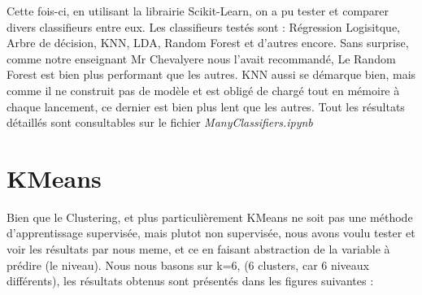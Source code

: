 \documentclass[11pt]{article}
\begin{document}
Cette fois-ci, en utilisant la librairie Scikit-Learn, on a pu tester et comparer divers classifieurs entre eux. \newline
Les classifieurs testés sont : Régression Logisitque, Arbre de décision, KNN, LDA, Random Forest et d'autres encore. \newline  \newline
Sans surprise, comme notre enseignant Mr Chevalyere nous l'avait recommandé, Le Random Forest est bien plus performant que les autres. \newline   \newline
KNN aussi se démarque bien, mais comme il ne construit pas de modèle et est obligé de chargé tout en mémoire à chaque lancement, ce dernier est bien plus lent que les autres. \newline\newline
Tout les résultats détaillés sont consultables sur le fichier \textit{ManyClassifiers.ipynb}


\section{KMeans}

Bien que le Clustering, et plus particulièrement KMeans ne soit pas une méthode d'apprentissage supervisée, mais plutot non supervisée, nous avons voulu tester et voir les résultats par nous meme, et ce en faisant abstraction de la variable à prédire (le niveau). \newline \newline
Nous nous basons sur k=6, (6 clusters, car 6 niveaux différents),  les résultats obtenus sont présentés dans les figures suivantes : \newline
\end{document}
